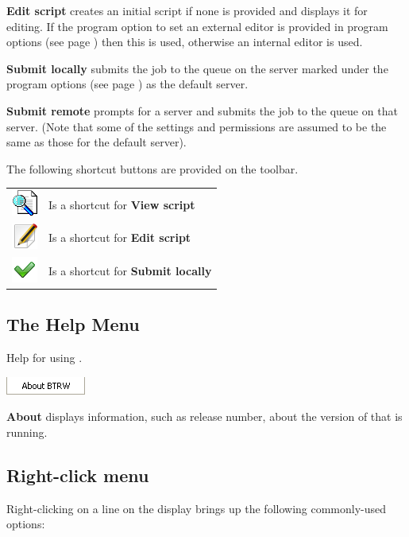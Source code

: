 \textbf{Edit script} creates an initial script if none is provided and displays it for editing. If the program option
to set an external editor is provided in program options (see page \pageref{bkm:progopts}) then this is used, otherwise
an internal editor is used.

\textbf{Submit locally} submits the job to the queue on the server marked under the program options (see page \pageref{bkm:progopts}) as
the default server.

\textbf{Submit remote} prompts for a server and submits the job to the queue on that server. (Note that some of the settings and
permissions are assumed to be the same as those for the default server).

The following shortcut buttons are provided on the toolbar.

\begin{tabular}{l p{12cm}}
\includegraphics{img/btqwviewjob.png} & Is a shortcut for \textbf{View script}\\
\includegraphics{img/btrwjobedit.png} & Is a shortcut for \textbf{Edit script}\\
\includegraphics{img/btrwjobsubmit.png} & Is a shortcut for \textbf{Submit locally}\\
\end{tabular}

\subsection{The Help Menu}
Help for using .

\includegraphics{img/btrwhelpmenu.png} 

\textbf{About} displays information, such as release number, about the
version of  that is running.

\subsection{Right-click menu}
Right-clicking on a line on the  display brings up the following commonly-used
options:

